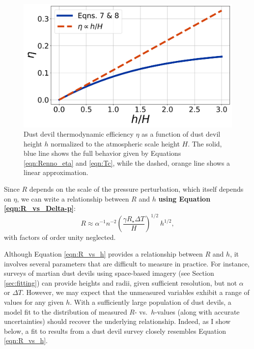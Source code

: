 \documentclass{aastex63}
\begin{document}
\begin{figure}
    \centering
    \includegraphics[width=\textwidth]{eta_vs_h-over-H.png}
    \caption{Dust devil thermodynamic efficiency $\eta$ as a function of dust devil height $h$ normalized to the atmospheric scale height $H$. The solid, blue line shows the full behavior given by Equations \ref{eqn:Renno_eta} and \ref{eqn:Tc}, while the dashed, orange line shows a linear approximation.}
    \label{fig:eta_vs_h-over-H}
\end{figure}

Since $R$ depends on the scale of the pressure perturbation, which itself depends on $\eta$, we can write a relationship between $R$ and $h$ {\bf using Equation \ref{eqn:R_vs_Delta-p}}:
\begin{equation}
    R \approx \alpha^{-1} n^{-2} \left( \dfrac{\gamma R_\star \Delta T}{H} \right)^{1/2}\ h^{1/2},\label{eqn:R_vs_h}
\end{equation}
with factors of order unity neglected.


Although Equation \ref{eqn:R_vs_h} provides a relationship between $R$ and $h$, it involves several parameters that are difficult to measure in practice. For instance, surveys of martian dust devils using space-based imagery (see Section \ref{sec:fitting}) can provide heights and radii, given sufficient resolution, but not $\alpha$ or $\Delta T$. However, we may expect that the unmeasured variables exhibit a range of values for any given $h$. With a sufficiently large population of dust devils, a model fit to the distribution of measured $R$- vs.~$h$-values (along with accurate uncertainties) should recover the underlying relationship. Indeed, as I show below, a fit to results from a dust devil survey closely resembles Equation \ref{eqn:R_vs_h}.
\end{document}
